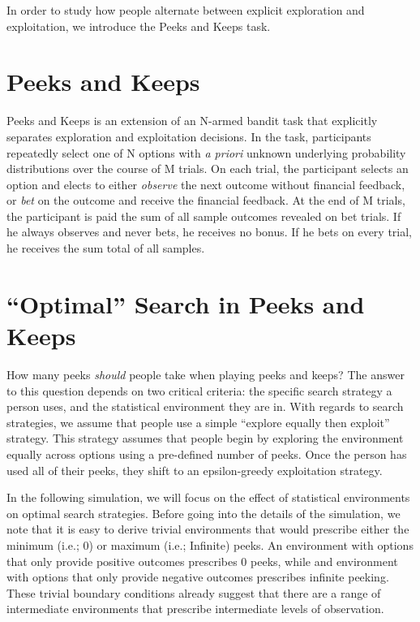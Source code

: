 \documentclass[a4paper,doc,natbib,floatsintext]{apa6}\usepackage[]{graphicx}\usepackage[]{color}
\begin{document}
In order to study how people alternate between explicit exploration and exploitation, we introduce the Peeks and Keeps task.


\section{Peeks and Keeps}

Peeks and Keeps is an extension of an N-armed bandit task that explicitly separates exploration and exploitation decisions. In the task, participants repeatedly select one of N options with \textit{a priori} unknown underlying probability distributions over the course of M trials. On each trial, the participant selects an option and elects to either \textit{observe} the next outcome without financial feedback, or \textit{bet} on the outcome and receive the financial feedback. At the end of M trials, the participant is paid the sum of all sample outcomes revealed on bet trials. If he always observes and never bets, he receives no bonus. If he bets on every trial, he receives the sum total of all samples.



\section{``Optimal'' Search in Peeks and Keeps}

How many peeks \textit{should} people take when playing peeks and keeps? The answer to this question depends on two critical criteria: the specific search strategy a person uses, and the statistical environment they are in. With regards to search strategies, 
we assume that people use a simple ``explore equally then exploit'' strategy. This strategy assumes that people begin by exploring the environment equally across options using a pre-defined number of peeks. Once the person has used all of their peeks, they shift to an epsilon-greedy exploitation strategy.

In the following simulation, we will focus on the effect of statistical environments on optimal search strategies. Before going into the details of the simulation, we note that it is easy to derive trivial environments that would prescribe either the minimum (i.e.; 0) or maximum (i.e.; Infinite) peeks. An environment with options that only provide positive outcomes prescribes 0 peeks, while and environment with options that only provide negative outcomes prescribes infinite peeking. These trivial boundary conditions already suggest that there are a range of intermediate environments that prescribe intermediate levels of observation.
\end{document}
